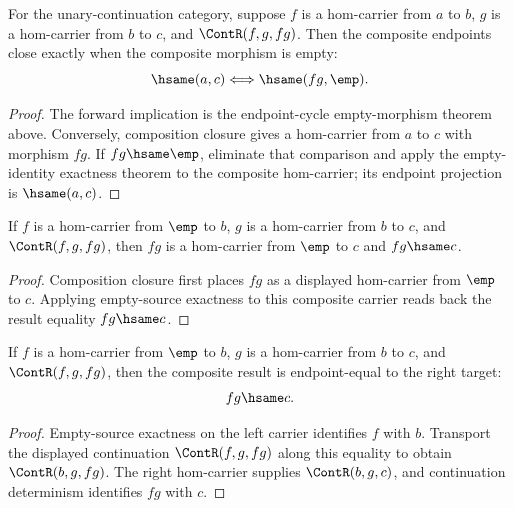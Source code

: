 \begin{theorem}
\label{thm:category-hom-carrier-composite-endpoint-cycle-morphism-empty-iff}
For the unary-continuation category, suppose $f$ is a hom-carrier from $a$ to
$b$, $g$ is a hom-carrier from $b$ to $c$, and $\ContR(f,g,fg)$. Then the
composite endpoints close exactly when the composite morphism is empty:
$$
\hsame(a,c)\Longleftrightarrow\hsame(fg,\emp).
$$
\end{theorem}
\begin{proof}
The forward implication is the endpoint-cycle empty-morphism theorem above.
Conversely, composition closure gives a hom-carrier from $a$ to $c$ with
morphism $fg$. If $fg\hsame\emp$, eliminate that comparison and apply the
empty-identity exactness theorem to the composite hom-carrier; its endpoint
projection is $\hsame(a,c)$.
\end{proof}

\begin{theorem}
\label{thm:category-hom-carrier-empty-source-composite-result}
If $f$ is a hom-carrier from $\emp$ to $b$, $g$ is a hom-carrier from $b$ to
$c$, and $\ContR(f,g,fg)$, then $fg$ is a hom-carrier from $\emp$ to $c$ and
$fg\hsame c$.
\end{theorem}
\begin{proof}
Composition closure first places $fg$ as a displayed hom-carrier from $\emp$
to $c$. Applying empty-source exactness to this composite carrier reads back
the result equality $fg\hsame c$.
\end{proof}

\begin{theorem}
\label{thm:category-hom-carrier-empty-source-comp-target-hsame}
If $f$ is a hom-carrier from $\emp$ to $b$, $g$ is a hom-carrier from $b$ to
$c$, and $\ContR(f,g,fg)$, then the composite result is endpoint-equal to the
right target:
$$
fg\hsame c.
$$
\end{theorem}
\begin{proof}
Empty-source exactness on the left carrier identifies $f$ with $b$. Transport
the displayed continuation $\ContR(f,g,fg)$ along this equality to obtain
$\ContR(b,g,fg)$. The right hom-carrier supplies $\ContR(b,g,c)$, and
continuation determinism identifies $fg$ with $c$.
\end{proof}

